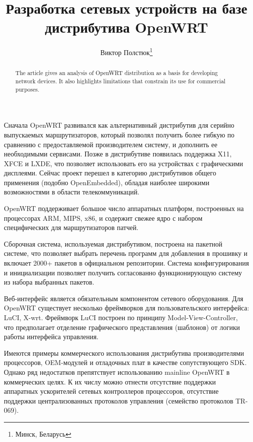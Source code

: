 \documentclass[10pt, a5paper]{article}
\begin{document}
\title{Разработка сетевых устройств на базе дистрибутива OpenWRT}%

\author{Виктор Полстюк\footnote{Минск, Беларусь}}
\maketitle

\begin{abstract}
The article gives an analysis of OpenWRT distribution as a basis for developing network devices. It also highlights limitations that constrain its use for commercial purposes.
\end{abstract}


Сначала OpenWRT развивался как альтернативный дистрибутив для серийно выпускаемых маршрутизаторов, который позволял получить более гибкую по сравнению с предоставляемой производителем систему, и дополнить ее необходимыми сервисами. Позже в дистрибутиве появилась поддержка X11, XFCE и LXDE, что позволяет использовать его на устройствах с графическими дисплеями. Сейчас проект перешел в категорию дистрибутивов общего применения (подобно OpenEmbedded), обладая наиболее широкими возможностями в области телекоммуникаций.

OpenWRT поддерживает большое число аппаратных платформ, построенных на процессорах ARM, MIPS, x86, и содержит свежее ядро с набором специфических для маршрутизаторов патчей. 

Сборочная система, используемая дистрибутивом, построена на пакетной системе, что позволяет выбрать перечень программ для добавления в прошивку и включает 2000+ пакетов в официальном репозитории. Система конфигурирования и инициализации позволяет получить согласованно функционирующую систему из набора выбранных пакетов.

Веб-интерфейс является обязательным компонентом сетевого оборудования.  Для OpenWRT существует несколько фреймворков для пользовательского интерфейса: LuCI, X-wrt. Фреймворк LuCI построен по принципу Model-View-Controller, что предполагает отделение графического представления (шаблонов) от логики работы интерфейса управления.

Имеются примеры коммерческого использования дистрибутива производителями процессоров, OEM-модулей и отладочных плат в качестве сопутствующего SDK. Однако ряд недостатков препятствует использованию mainline OpenWRT в коммерческих целях. К их числу можно отнести отсутствие поддержки аппаратных ускорителей сетевых контроллеров процессоров, отсутствие поддержки централизованных протоколов управления (семейство протоколов TR-069).
\end{document}
